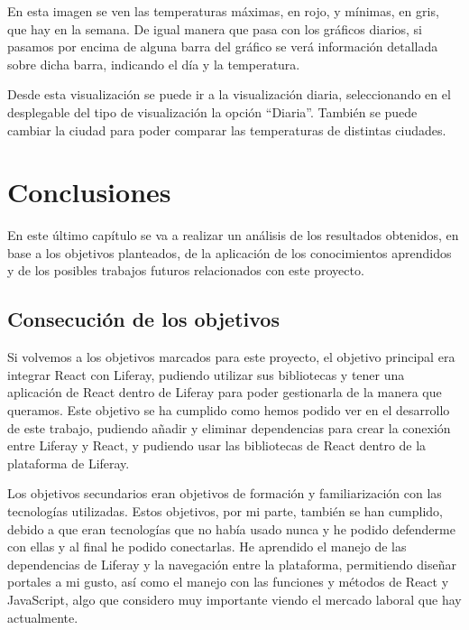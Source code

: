 \documentclass[a4paper, 12pt]{book}
\begin{document}
En esta imagen se ven las temperaturas máximas, en rojo, y mínimas, en gris, que hay en la semana. De igual manera que pasa con los gráficos diarios, si pasamos por encima de alguna barra del gráfico se verá información detallada sobre dicha barra, indicando el día y la temperatura.

\vspace{5mm}
Desde esta visualización se puede ir a la visualización diaria, seleccionando en el desplegable del tipo de visualización la opción ``Diaria''. También se puede cambiar la ciudad para poder comparar las temperaturas de distintas ciudades.





\cleardoublepage
\chapter{Conclusiones}
\label{chap:conclusiones}
En este último capítulo se va a realizar un análisis de los resultados obtenidos, en base a los objetivos planteados, de la aplicación de los conocimientos aprendidos y de los posibles trabajos futuros relacionados con este proyecto.

\section{Consecución de los objetivos}
\label{sec:consecucion_objectivos}
Si volvemos a los objetivos marcados para este proyecto, el objetivo principal era integrar React con Liferay, pudiendo utilizar sus bibliotecas y tener una aplicación de React dentro de Liferay para poder gestionarla de la manera que queramos. Este objetivo se ha cumplido como hemos podido ver en el desarrollo de este trabajo, pudiendo añadir y eliminar dependencias para crear la conexión entre Liferay y React, y pudiendo usar las bibliotecas de React dentro de la plataforma de Liferay.

\vspace{5mm}
Los objetivos secundarios eran objetivos de formación y familiarización con las tecnologías utilizadas. Estos objetivos, por mi parte, también se han cumplido, debido a que eran tecnologías que no había usado nunca y he podido defenderme con ellas y al final he podido conectarlas. He aprendido el manejo de las dependencias de Liferay y la navegación entre la plataforma, permitiendo diseñar portales a mi gusto, así como el manejo con las funciones y métodos de React y JavaScript, algo que considero muy importante viendo el mercado laboral que hay actualmente.
\end{document}
